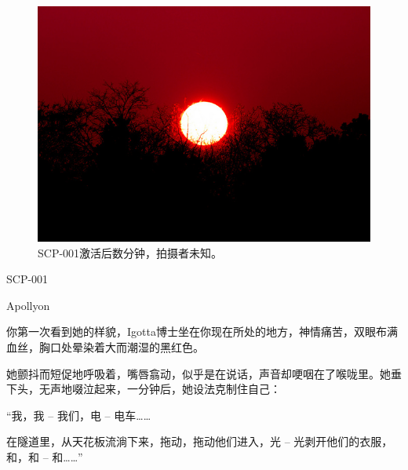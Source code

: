 \hr


\newpage



\hr


\begin{figure}[H]
	\centering
	\includegraphics[width=0.5\linewidth]{images/SCP.001.when.night.breaks.jpg}
	\caption*{SCP-001激活后数分钟，拍摄者未知。}
\end{figure}

SCP-001

Apollyon




\begin{scpbox}

你第一次看到她的样貌，Igotta博士坐在你现在所处的地方，神情痛苦，双眼布满血丝，胸口处晕染着大而潮湿的黑红色。

她颤抖而短促地呼吸着，嘴唇翕动，似乎是在说话，声音却哽咽在了喉咙里。她垂下头，无声地啜泣起来，一分钟后，她设法克制住自己：

\end{scpbox}

\begin{scpdialog}

“我，我 – 我们，电 – 电车……

在隧道里，从天花板流淌下来，拖动，拖动他们进入，光 – 光剥开他们的衣服，和，和 – 和……”

\end{scpdialog}

